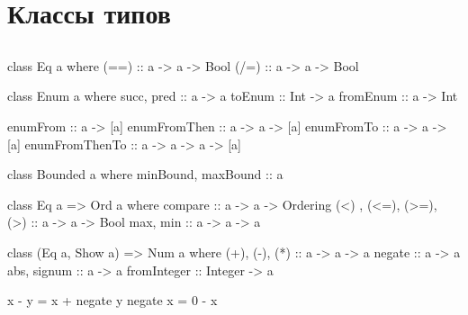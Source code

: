 \documentclass[11pt,a4paper]{article}
\begin{document}
\section{Классы типов}
\subsection{}
\begin{minipage}{0.47\textwidth}
\begin{hscode}
class Eq a where
  (==) :: a -> a -> Bool
  (/=) :: a -> a -> Bool
\end{hscode}
\begin{hscode}
class Enum a where 
  succ, pred     :: a -> a
  toEnum         :: Int -> a
  fromEnum       :: a -> Int

  enumFrom       :: a -> [a]            
  enumFromThen   :: a -> a -> [a]       
  enumFromTo     :: a -> a -> [a]       
  enumFromThenTo :: a -> a -> a -> [a]  

class Bounded a where
  minBound, maxBound :: a
\end{hscode}
\end{minipage}
\hfill
\begin{minipage}{0.47\textwidth}
\begin{hscode}
class Eq a => Ord a where
  compare :: a -> a -> Ordering
  (<) , (<=), (>=), (>) :: a -> a -> Bool
  max, min :: a -> a -> a
\end{hscode}
\begin{hscode}
class (Eq a, Show a) => Num a where
  (+), (-), (*) :: a -> a -> a
  negate        :: a -> a
  abs, signum   :: a -> a
  fromInteger   :: Integer -> a

  x - y = x + negate y
  negate x = 0 - x
\end{hscode}
\end{minipage}
\end{document}
